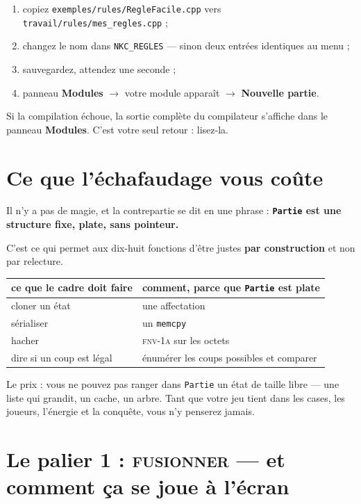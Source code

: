\begin{enumerate}
  \item copiez \texttt{exemples/rules/RegleFacile.cpp} vers
        \texttt{travail/rules/mes\_regles.cpp} ;
  \item changez le nom dans \texttt{NKC\_REGLES} --- sinon deux entrées
        identiques au menu ;
  \item sauvegardez, attendez une seconde ;
  \item panneau \textbf{Modules} $\rightarrow$ votre module apparaît
        $\rightarrow$ \textbf{Nouvelle partie}.
\end{enumerate}

Si la compilation échoue, la sortie complète du compilateur s'affiche dans le
panneau \textbf{Modules}. C'est votre seul retour : lisez-la.

\section{Ce que l'échafaudage vous coûte}

Il n'y a pas de magie, et la contrepartie se dit en une phrase : \textbf{\texttt{Partie}
est une structure fixe, plate, sans pointeur.}

C'est ce qui permet aux dix-huit fonctions d'être justes \textbf{par
construction} et non par relecture.

\begin{center}
\begin{tabular}{@{}p{5.2cm}p{8.2cm}@{}}
\toprule
\textbf{ce que le cadre doit faire} & \textbf{comment, parce que \texttt{Partie} est plate} \\
\midrule
cloner un état & une affectation \\
sérialiser & un \texttt{memcpy} \\
hacher & \textsc{fnv-1a} sur les octets \\
dire si un coup est légal & énumérer les coups possibles et comparer \\
\bottomrule
\end{tabular}
\end{center}

Le prix : vous ne pouvez pas ranger dans \texttt{Partie} un état de taille libre
--- une liste qui grandit, un cache, un arbre. Tant que votre jeu tient dans les
cases, les joueurs, l'énergie et la conquête, vous n'y penserez jamais.

\section{Le palier 1 : \textsc{fusionner} --- et comment ça se joue à l'écran}

